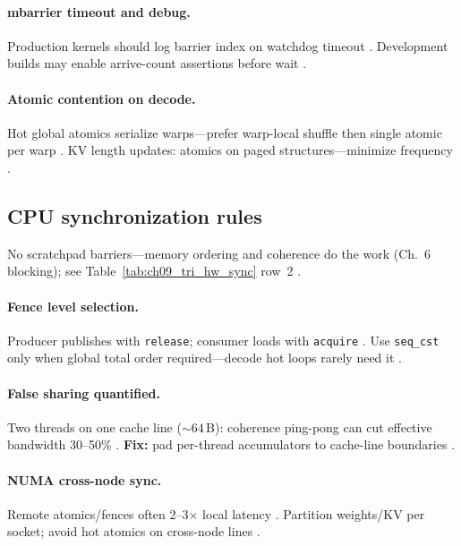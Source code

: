 \paragraph{mbarrier timeout and debug.}
Production kernels should log barrier index on watchdog timeout \citep{taxbreak2026,shah2024flashattention3,yirage2026}.
Development builds may enable arrive-count assertions before wait \citep{nvidia2022hopper,chen2020compilerbasedhardw,semianalysis2024tma}.

\paragraph{Atomic contention on decode.}
Hot global atomics serialize warps---prefer warp-local shuffle then single atomic per warp \citep{dao2022flashattention,memoryfloor2026,patel2025llminference}.
KV length updates: atomics on paged structures---minimize frequency \citep{kwon2023vllm,dao2023flashdecoding,yirage2026}.

\subsection{CPU synchronization rules}
No scratchpad barriers---memory ordering and coherence do the work (Ch.~6 blocking); see Table~\ref{tab:ch09_tri_hw_sync} row~2 \citep{dlbook,chen2020compilerbasedhardw}.

\paragraph{Fence level selection.}
Producer publishes with \texttt{release}; consumer loads with \texttt{acquire} \citep{dlbook,patel2025llminference}.
Use \texttt{seq\_cst} only when global total order required---decode hot loops rarely need it \citep{yirage2026,taxbreak2026}.

\paragraph{False sharing quantified.}
Two threads on one cache line (${\sim}64$\,B): coherence ping-pong can cut effective bandwidth 30--50\% \citep{dlbook,memoryfloor2026}.
\textbf{Fix:} pad per-thread accumulators to cache-line boundaries \citep{chen2020compilerbasedhardw,patel2025llminference}.

\paragraph{NUMA cross-node sync.}
Remote atomics/fences often 2--3$\times$ local latency \citep{patel2025llminference,taxbreak2026}.
Partition weights/KV per socket; avoid hot atomics on cross-node lines \citep{kwon2023vllm,yirage2026}.

